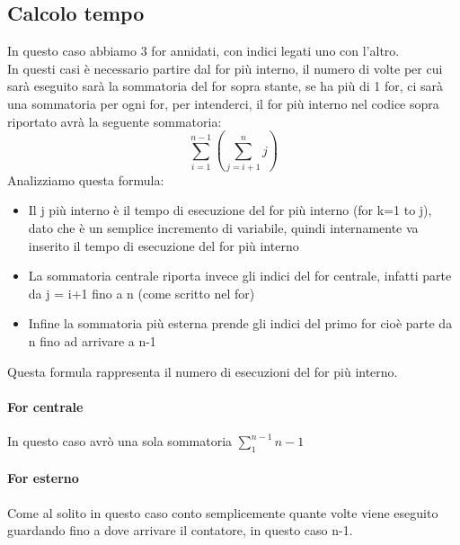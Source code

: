 \subsection{Calcolo tempo}
In questo caso abbiamo 3 for annidati, con indici legati uno con l'altro.\\
In questi casi è necessario partire dal for più interno, il numero di volte per cui sarà eseguito sarà la
sommatoria del for sopra stante, se ha più di 1 for, ci sarà una sommatoria per ogni for, per intenderci,
il for più interno nel codice sopra riportato avrà la seguente sommatoria:
\begin{equation*}
    \sum_{i=1}^{n-1} (\sum_{j=i+1}^n j)
\end{equation*}
Analizziamo questa formula:
\begin{itemize}
    \item Il j più interno è il tempo di esecuzione del for più interno (for k=1 to j), dato che è un
    semplice incremento di variabile, quindi internamente va inserito il tempo di esecuzione del for più interno
    \item La sommatoria centrale riporta invece gli indici del for centrale, infatti parte da j = i+1 fino a n (come scritto
    nel for)
    \item Infine la sommatoria più esterna prende gli indici del primo for cioè parte da n fino ad arrivare a n-1
\end{itemize}
Questa formula rappresenta il numero di esecuzioni del for più interno.\\
\paragraph*{For centrale} In questo caso avrò una sola sommatoria $\sum_1^{n-1} n-1$
\paragraph*{For esterno} Come al solito in questo caso conto semplicemente quante volte viene eseguito
guardando fino a dove arrivare il contatore, in questo caso n-1.
